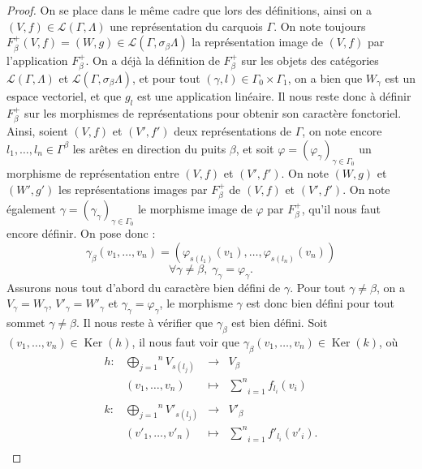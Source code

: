 \documentclass[a4paper,10pt]{article}
\DeclareMathOperator{\Ker}{Ker}
\begin{document}
\begin{proof}
	On se place dans le même cadre que lors des définitions, ainsi on a $(V,f)\in\mathscr{L}(\Gamma,\Lambda)$ une représentation du carquois $\Gamma$. On note toujours $F_{\beta}^{+}(V,f)=(W,g)\in\mathscr{L}(\Gamma,\sigma_{\beta}\Lambda)$ la représentation image de $(V,f)$ par l'application $F_{\beta}^{+}$. On a déjà la définition de $F_{\beta}^{+}$ sur les objets des catégories $\mathscr{L}(\Gamma,\Lambda)$ et $\mathscr{L}(\Gamma,\sigma_{\beta}\Lambda)$, et pour tout $(\gamma,l)\in\Gamma_{0}\times\Gamma_{1}$, on a bien que $W_{\gamma}$ est un espace vectoriel, et que $g_{l}$ est une application linéaire. Il nous reste donc à définir $F_{\beta}^{+}$ sur les morphismes de représentations pour obtenir son caractère fonctoriel. Ainsi, soient $(V,f)$ et $(V',f')$ deux représentations de $\Gamma$, on note encore $l_{1},\dots,l_{n}\in\Gamma^{\beta}$ les arêtes en direction du puits $\beta$, et soit $\varphi=(\varphi_{\gamma})_{\gamma\in\Gamma_{0}}$ un morphisme de représentation entre $(V,f)$ et $(V',f')$. On note $(W,g)$ et $(W',g')$ les représentations images par $F_{\beta}^{+}$ de $(V,f)$ et $(V',f')$. On note également $\gamma=(\gamma_{\gamma})_{\gamma\in\Gamma_{0}}$ le morphisme image de $\varphi$ par $F_{\beta}^{+}$, qu'il nous faut encore définir. On pose donc :
	\[	
		\gamma_{\beta}(v_{1},\dots,v_{n})=(\varphi_{s(l_{1})}(v_{1}),\dots,\varphi_{s(l_{n})}(v_{n}))
	\]
	\[
		\forall \gamma\neq\beta,\; \gamma_{\gamma}=\varphi_{\gamma}.
	\]
	Assurons nous tout d'abord du caractère bien défini de $\gamma$. Pour tout $\gamma\neq\beta$, on a $V_{\gamma}=W_{\gamma}$, $V'_{\gamma}=W'_{\gamma}$ et $\gamma_{\gamma}=\varphi_{\gamma}$, le morphisme $\gamma$ est donc bien défini pour tout sommet $\gamma\neq\beta$. Il nous reste à vérifier que $\gamma_{\beta}$ est bien défini. Soit $(v_{1},\dots,v_{n})\in\Ker(h)$, il nous faut voir que $\gamma_{\beta}(v_{1},\dots,v_{n})\in\Ker(k)$, où
	\[
\begin{array}{lccc}
	h : & \overset{n}{\underset{j=1}{\bigoplus}}V_{s(l_{j})}&\rightarrow & V_{\beta} \\ 
	& (v_{1},\dots,v_{n})&\mapsto & \underset{i=1}{\overset{n}{\sum}}f_{l_{i}}(v_{i})\\
	&&&\\
	k : & \overset{n}{\underset{j=1}{\bigoplus}}V'_{s(l_{j})}&\rightarrow & V'_{\beta} \\ 
	& (v'_{1},\dots,v'_{n})&\mapsto & \underset{i=1}{\overset{n}{\sum}}f'_{l_{i}}(v'_{i}).\\
\end{array}
\]
\end{proof}
\end{document}
